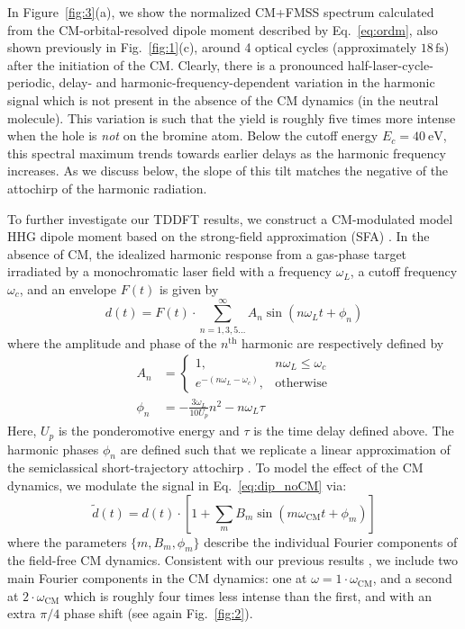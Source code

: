 \documentclass[journal=jacsat,manuscript=article]{achemso}
\begin{document}
\noindent In Figure~\ref{fig:3}(a), we show the normalized CM+FMSS spectrum calculated from the CM-orbital-resolved dipole moment described by Eq.~{\ref{eq:ordm}}, also shown previously in Fig.~{\ref{fig:1}}(c), around 4 optical cycles (approximately $18\, \text{fs}$) after the initiation of the CM. Clearly, there is a pronounced half-laser-cycle-periodic, delay- and harmonic-frequency-dependent variation in the harmonic signal which is not present in the absence of the CM dynamics (in the neutral molecule). This variation is such that the yield is roughly five times more intense when the hole is \emph{not} on the bromine atom. Below the cutoff energy $E_{c} = 40\ \text{eV}$, this spectral maximum trends towards earlier delays as the harmonic frequency increases. As we discuss below, the slope of this tilt matches the negative of the attochirp of the harmonic radiation.

To further investigate our TDDFT results, we construct a CM-modulated model HHG dipole moment based on the strong-field approximation (SFA) \cite{lewenstein1994}. In the absence of CM, the idealized harmonic response from a gas-phase target irradiated by a monochromatic laser field with a frequency $\omega_{L}$, a cutoff frequency $\omega_{c}$, and an envelope $F(t)$ is given by
\begin{equation}\label{eq:dip_noCM}
    d(t) = F(t) \cdot \sum_{n=1,3,5\ldots}^{\infty} A_{n} \sin{\left(n\omega_{L}t + \phi_{n}\right)}
\end{equation}
where the amplitude and phase of the $n^{\text{th}}$ harmonic are respectively defined by
\begin{align}
    A_{n} &= \begin{cases} 1, & n \omega_{L} \leq \omega_{c} \\ e^{-(n\omega_{L} - \omega_{c})}, & \text{otherwise} \end{cases} \label{eq:model_amp}\\
    \phi_{n} &= -\frac{3 \omega_{L}}{10 U_{p}}n^{2} - n \omega_{L} \tau \label{eq:model_phase}
\end{align}
Here, $U_{p}$ is the ponderomotive energy and $\tau$ is the time delay defined above. The harmonic phases $\phi_{n}$ are defined such that we replicate a linear approximation of the semiclassical short-trajectory attochirp \cite{chang2011}. To model the effect of the CM dynamics, we modulate the signal in Eq.~{\ref{eq:dip_noCM}} via:
\begin{equation}\label{eq:dip_CM}
    \tilde{d}(t) = d(t) \cdot \left[1 + \sum_{m} B_{m} \sin{(m \omega_{\text{CM}} t + \phi_{m})}\right]
\end{equation}
where the parameters $\{m, B_{m}, \phi_{m}\}$ describe the individual Fourier components of the field-free CM dynamics.  Consistent with our previous results \cite{hamer2022}, we include two main Fourier components in the CM dynamics: one at $\omega = 1 \cdot \omega_{\text{CM}}$, and a second at $2 \cdot \omega_{\text{CM}}$ which is roughly four times less intense than the first, and with an extra $\pi/4$ phase shift (see again Fig.~{\ref{fig:2}}). 
\end{document}
